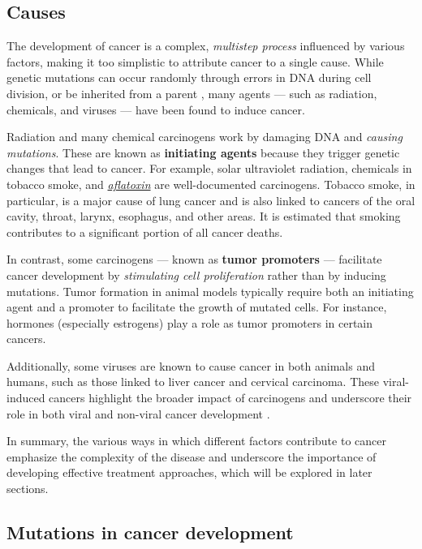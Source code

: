 \subsection{Causes}

The development of cancer is a complex, \textit{multistep process} influenced by various factors, making it too simplistic to attribute cancer to a single cause. While genetic mutations can occur randomly through errors in DNA during cell division, or be inherited from a parent \cite{cancer2}, many agents --- such as radiation, chemicals, and viruses --- have been found to induce cancer.

Radiation and many chemical carcinogens work by damaging DNA and \textit{causing mutations}. These are known as \textbf{initiating agents} because they trigger genetic changes that lead to cancer. For example, solar ultraviolet radiation, chemicals in tobacco smoke, and \href{https://en.wikipedia.org/wiki/Aflatoxin}{\textit{aflatoxin}} are well-documented carcinogens. Tobacco smoke, in particular, is a major cause of lung cancer and is also linked to cancers of the oral cavity, throat, larynx, esophagus, and other areas. It is estimated that smoking contributes to a significant portion of all cancer deaths.

In contrast, some carcinogens --- known as \textbf{tumor promoters} --- facilitate cancer development by \textit{stimulating cell proliferation} rather than by inducing mutations. Tumor formation in animal models typically require both an initiating agent and a promoter to facilitate the growth of mutated cells. For instance, hormones (especially estrogens) play a role as tumor promoters in certain cancers.

Additionally, some viruses are known to cause cancer in both animals and humans, such as those linked to liver cancer and cervical carcinoma. These viral-induced cancers highlight the broader impact of carcinogens and underscore their role in both viral and non-viral cancer development \cite{nih_cancer_dev}.

In summary, the various ways in which different factors contribute to cancer emphasize the complexity of the disease and underscore the importance of developing effective treatment approaches, which will be explored in later sections.

\subsection{Mutations in cancer development}

